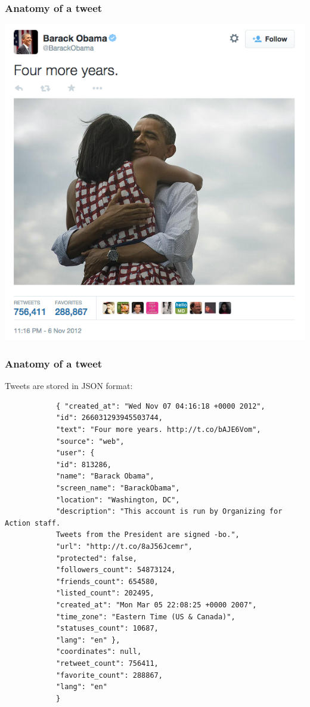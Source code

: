 \documentclass{beamer}
\begin{document}
\begin{frame}
	\frametitle{Anatomy of a tweet}
	\centering\includegraphics[height=.8\textheight]{figures/obama.png}
	
\end{frame}

\begin{frame}[fragile]
	\frametitle{Anatomy of a tweet}
	Tweets are stored in JSON format:\vspace{.25cm}\\
	\centering\begin{minipage}[c]{.80\textwidth}
		\begin{tiny}\begin{verbatim}
			{ "created_at": "Wed Nov 07 04:16:18 +0000 2012",
			"id": 266031293945503744,
			"text": "Four more years. http://t.co/bAJE6Vom",
			"source": "web",
			"user": {
			"id": 813286,
			"name": "Barack Obama",
			"screen_name": "BarackObama",
			"location": "Washington, DC",
			"description": "This account is run by Organizing for Action staff. 
			Tweets from the President are signed -bo.",
			"url": "http://t.co/8aJ56Jcemr",
			"protected": false,
			"followers_count": 54873124,
			"friends_count": 654580,
			"listed_count": 202495,
			"created_at": "Mon Mar 05 22:08:25 +0000 2007",
			"time_zone": "Eastern Time (US & Canada)",
			"statuses_count": 10687,
			"lang": "en" },
			"coordinates": null,
			"retweet_count": 756411,
			"favorite_count": 288867,
			"lang": "en"
			}
			\end{verbatim}\end{tiny}\end{minipage}
\end{frame}
\end{document}
